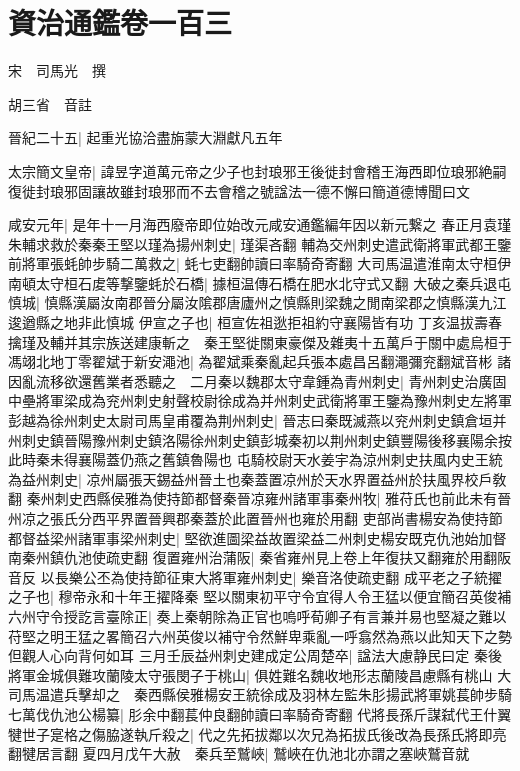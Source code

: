 \chapter{資治通鑑卷一百三}
宋　司馬光　撰

胡三省　音註

晉紀二十五|{
	起重光協洽盡旃蒙大淵獻凡五年}


太宗簡文皇帝|{
	諱昱字道萬元帝之少子也封琅邪王後徙封會稽王海西即位琅邪絶嗣復徙封琅邪固讓故雖封琅邪而不去會稽之號諡法一德不懈曰簡道德博聞曰文}


咸安元年|{
	是年十一月海西廢帝即位始改元咸安通鑑編年因以新元繋之}
春正月袁瑾朱輔求救於秦秦王堅以瑾為揚州刺史|{
	瑾渠吝翻}
輔為交州刺史遣武衛將軍武都王鑒前將軍張蚝帥步騎二萬救之|{
	蚝七吏翻帥讀曰率騎奇寄翻}
大司馬温遣淮南太守桓伊南頓太守桓石䖍等撃鑒蚝於石橋|{
	據桓温傳石橋在肥水北守式又翻}
大破之秦兵退屯慎城|{
	慎縣漢屬汝南郡晉分屬汝隂郡唐廬州之慎縣則梁魏之閒南梁郡之慎縣漢九江逡遒縣之地非此慎城}
伊宣之子也|{
	桓宣佐祖逖拒祖約守襄陽皆有功}
丁亥温拔壽春擒瑾及輔并其宗族送建康斬之　秦王堅徙關東豪傑及雜夷十五萬戶于關中處烏桓于馮翊北地丁零翟斌于新安澠池|{
	為翟斌乘秦亂起兵張本處昌呂翻澠彌兖翻斌音彬}
諸因亂流移欲還舊業者悉聽之　二月秦以魏郡太守韋鍾為青州刺史|{
	青州刺史治廣固}
中壘將軍梁成為兖州刺史射聲校尉徐成為并州刺史武衛將軍王鑒為豫州刺史左將軍彭越為徐州刺史太尉司馬皇甫覆為荆州刺史|{
	晉志曰秦既滅燕以兖州刺史鎮倉垣并州刺史鎮晉陽豫州刺史鎮洛陽徐州刺史鎮彭城秦初以荆州刺史鎮豐陽後移襄陽余按此時秦未得襄陽蓋仍燕之舊鎮魯陽也}
屯騎校尉天水姜宇為涼州刺史扶風内史王統為益州刺史|{
	凉州屬張天錫益州晉土也秦蓋置凉州於天水界置益州於扶風界校戶敎翻}
秦州刺史西縣侯雅為使持節都督秦晉凉雍州諸軍事秦州牧|{
	雅苻氏也前此未有晉州凉之張氏分西平界置晉興郡秦蓋於此置晉州也雍於用翻}
吏部尚書楊安為使持節都督益梁州諸軍事梁州刺史|{
	堅欲進圖梁益故置梁益二州刺史楊安既克仇池始加督南秦州鎮仇池使疏吏翻}
復置雍州治蒲阪|{
	秦省雍州見上卷上年復扶又翻雍於用翻阪音反}
以長樂公丕為使持節征東大將軍雍州刺史|{
	樂音洛使疏吏翻}
成平老之子統擢之子也|{
	穆帝永和十年王擢降秦}
堅以關東初平守令宜得人令王猛以便宜簡召英俊補六州守令授訖言臺除正|{
	奏上秦朝除為正官也嗚呼荀卿子有言兼并易也堅凝之難以苻堅之明王猛之畧簡召六州英俊以補守令然鮮卑乘亂一呼翕然為燕以此知天下之勢但觀人心向背何如耳}
三月壬辰益州刺史建成定公周楚卒|{
	諡法大慮静民曰定}
秦後將軍金城俱難攻蘭陵太守張閔子于桃山|{
	俱姓難名魏收地形志蘭陵昌慮縣有桃山}
大司馬温遣兵擊却之　秦西縣侯雅楊安王統徐成及羽林左監朱肜揚武將軍姚萇帥步騎七萬伐仇池公楊纂|{
	肜余中翻萇仲良翻帥讀曰率騎奇寄翻}
代將長孫斤謀弑代王什翼犍世子寔格之傷脇遂執斤殺之|{
	代之先拓拔鄰以次兄為拓拔氏後改為長孫氏將即亮翻犍居言翻}
夏四月戊午大赦　秦兵至鷲峽|{
	鷲峽在仇池北亦謂之塞峽鷲音就}
